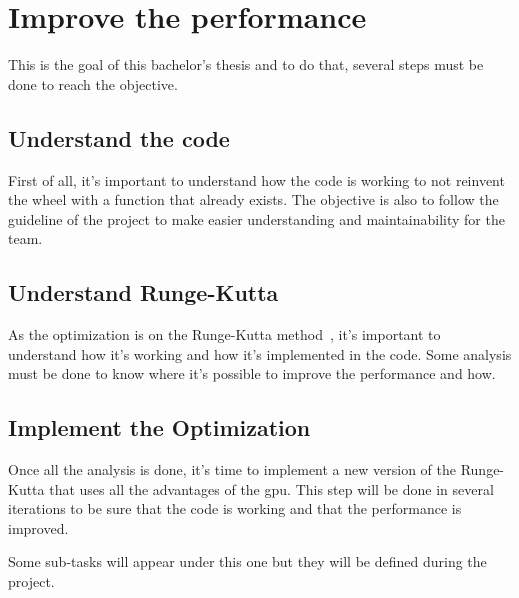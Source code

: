 \section{Improve the performance}
\label{spec:ch:activities:improve-the-performance}

This is the goal of this bachelor's thesis and to do that, several steps must be done to reach the objective.


\subsection{Understand the code}
\label{spec:ch:activities:improve-the-performance:understand-the-code}

First of all, it's important to understand how the code is working to not reinvent the wheel with a function that already exists.
The objective is also to follow the guideline of the project to make easier understanding and maintainability for the team.


\subsection{Understand Runge-Kutta}
\label{spec:ch:activities:improve-the-performance:understand-runge-kutta}

As the optimization is on the Runge-Kutta method~\cite{Runge-Kutta-methods}, it's important to understand how it's working and how it's implemented in the code.
Some analysis must be done to know where it's possible to improve the performance and how.


\subsection{Implement the Optimization}
\label{spec:ch:activities:improve-the-performance:implement-the-optimization}

Once all the analysis is done, it's time to implement a new version of the Runge-Kutta that uses all the advantages of the \acrshort{gpu}.
This step will be done in several iterations to be sure that the code is working and that the performance is improved.

Some sub-tasks will appear under this one but they will be defined during the project.

